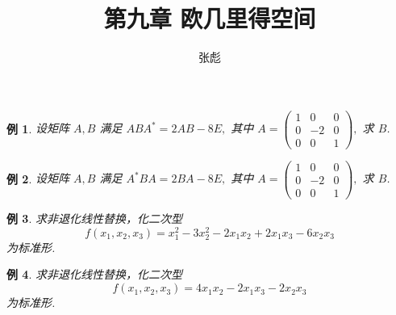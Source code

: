 \documentclass[13pt]{beamer}
\newtheorem{exa}{例}
\begin{document}

\title[]{第九章 \quad  欧几里得空间}
\author[]{{\large 张彪}\\  }

\date{}


\AtBeginSection[]
{
	\setcounter{exa}{0}
	\setcounter{equation}{0}
}





\setcounter{exa}{0}
\begin{frame}
\begin{exa}
	设矩阵 $A, B$ 满足 $A B A^{*}=2 A B-8 E,$ 其中 $A=\left(\begin{array}{ccc}1 & 0 & 0 \\ 0 & -2 & 0 \\ 0 & 0 & 1\end{array}\right),$ 求 $B$.
\end{exa}

\begin{exa}
	设矩阵 $A, B$ 满足 $A^{*} B A=2 B A-8 E,$ 其中 $A=\left(\begin{array}{ccc}1 & 0 & 0 \\ 0 & -2 & 0 \\ 0 & 0 & 1\end{array}\right),$ 求 $B$.
\end{exa}
\end{frame}


\setcounter{exa}{0}

\begin{frame}
\begin{exa}
求非退化线性替换，化二次型 $$f\left(x_{1}, x_{2}, x_{3}\right)=x_{1}^{2}-3 x_{2}^{2}-2 x_{1} x_{2}+2 x_{1} x_{3}-6 x_{2} x_{3}$$ 为标准形.
\end{exa}
\begin{exa}
求非退化线性替换，化二次型 $$f\left(x_{1}, x_{2}, x_{3}\right)=4 x_{1} x_{2}-2 x_{1} x_{3}-2 x_{2} x_{3}$$ 为标准形.
\end{exa}
\end{frame}
\end{document}
